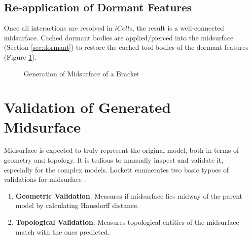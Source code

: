 \subsection{Re-application of Dormant Features}

Once all interactions are resolved in $iCell$s, the result is a well-connected midsurface. Cached dormant bodies are applied/pierced into the midsurface  (Section \ref{sec:dormant}) to restore the cached tool-bodies of the dormant features (Figure \ref{fig_midsdorm}).



	\begin{figure}[!h]
	\centering   

	 \qquad
	\caption{Generation of Midsurface of a Bracket}
	\label{fig_midsdorm}
	\end{figure}
	

\section{Validation of Generated Midsurface}
\label{cagd:sec:validation}

Midsurface is expected to truly represent the original model, both in terms of geometry and topology. It is tedious to manually inspect and validate it, especially for the complex models. 
Lockett enumerates two basic typoes of validations for midsurface  \cite{Lockett2008}:
\begin{enumerate}[noitemsep,topsep=2pt,parsep=2pt,partopsep=2pt]
\item \textbf{Geometric Validation}: Measures if midsurface lies midway of the parent model by calculating Hausdorff distance.
\item \textbf{Topological Validation}: Measures topological entities of the midsurface match with the ones predicted.
\end{enumerate}

